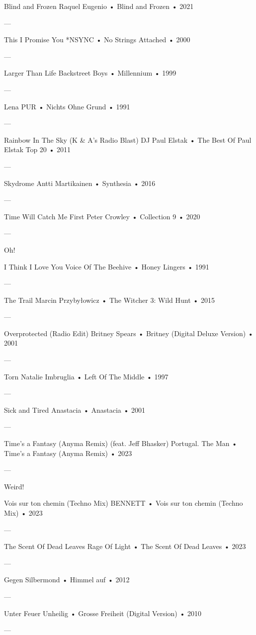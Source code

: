 Blind and Frozen
Raquel Eugenio
 •
Blind and Frozen
 •
2021


—

This I Promise You
*NSYNC
 •
No Strings Attached
 • 2000

—

Larger Than Life
Backstreet Boys
 •
Millennium
 • 1999

—

Lena
PUR
 •
Nichts Ohne Grund
 • 1991

—

Rainbow In The Sky (K & A's Radio Blast)
DJ Paul Elstak
 •
The Best Of Paul Elstak Top 20
 • 2011

—

Skydrome
Antti Martikainen
 •
Synthesia
 • 2016

—

Time Will Catch Me First
Peter Crowley
 •
Collection 9
 • 2020

—

Oh!

I Think I Love You
Voice Of The Beehive
 •
Honey Lingers
 • 1991

—

The Trail
Marcin Przybyłowicz
 •
The Witcher 3: Wild Hunt
 • 2015

—

Overprotected (Radio Edit)
Britney Spears
 •
Britney (Digital Deluxe Version)
 • 2001

—

Torn
Natalie Imbruglia
 •
Left Of The Middle
 • 1997

—

Sick and Tired
Anastacia
 •
Anastacia
 • 2001

—

Time’s a Fantasy (Anyma Remix) (feat. Jeff Bhasker)
Portugal. The Man
 •
Time’s a Fantasy (Anyma Remix)
 •
2023

—

Weird!

Vois sur ton chemin (Techno Mix)
BENNETT
 •
Vois sur ton chemin (Techno Mix)
 •
2023

—

The Scent Of Dead Leaves
Rage Of Light
 •
The Scent Of Dead Leaves
 •
2023

—

Gegen
Silbermond
 •
Himmel auf
 •
2012

—

Unter Feuer
Unheilig
 •
Grosse Freiheit (Digital Version)
 •
2010

—

